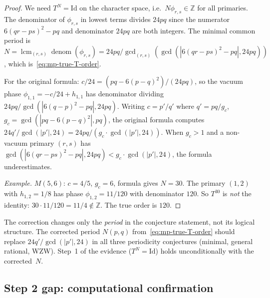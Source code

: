 \documentclass[11pt]{article}
\newcommand{\Z}{\mathbb{Z}}
\begin{document}
\begin{proof}
We need $T^N = \mathrm{Id}$ on the character space,
i.e.\ $N\phi_{r,s} \in \Z$ for all primaries.
The denominator of $\phi_{r,s}$ in lowest terms
divides $24pq$ since the numerator $6(qr-ps)^2 - pq$
and denominator $24pq$ are both integers.
The minimal common period is
$N = \operatorname{lcm}_{(r,s)} \operatorname{denom}(\phi_{r,s})
= 24pq / \gcd_{(r,s)}(\gcd(|6(qr-ps)^2 - pq|, 24pq))$,
which is~\eqref{eq:mp-true-T-order}.

For the original formula:
$c/24 = (pq - 6(p-q)^2)/(24pq)$, so the vacuum phase
$\phi_{1,1} = -c/24 + h_{1,1}$ has denominator dividing
$24pq/\gcd(|6(q-p)^2 - pq|, 24pq)$.
Writing $c = p'/q'$ where $q' = pq/g_c$,
$g_c = \gcd(|pq-6(p-q)^2|, pq)$, the original formula computes
$24q'/\gcd(|p'|,24) = 24pq / (g_c \cdot \gcd(|p'|,24))$.
When $g_c > 1$ and a non-vacuum primary $(r,s)$ has
$\gcd(|6(qr-ps)^2-pq|, 24pq) < g_c \cdot \gcd(|p'|,24)$,
the formula underestimates.

\emph{Example.}
$M(5,6)$: $c = 4/5$, $g_c = 6$, formula gives $N = 30$.
The primary $(1,2)$ with $h_{1,2} = 1/8$ has phase
$\phi_{1,2} = 11/120$ with denominator $120$.
So $T^{30}$ is \emph{not} the identity: $30 \cdot 11/120 = 11/4
\notin \Z$.  The true order is $120$.
\end{proof}

\begin{remark}
The correction changes only the \emph{period} in the
conjecture statement, not its logical structure.
The corrected period $N(p,q)$ from~\eqref{eq:mp-true-T-order}
should replace $24q'/\gcd(|p'|,24)$ in all three periodicity
conjectures (minimal, general rational, WZW).
Step~1 of the evidence ($T^N = \mathrm{Id}$) holds
unconditionally with the corrected~$N$.
\end{remark}

\subsection{Step 2 gap: computational confirmation}
\label{subsec:mp-step2}
\end{document}
